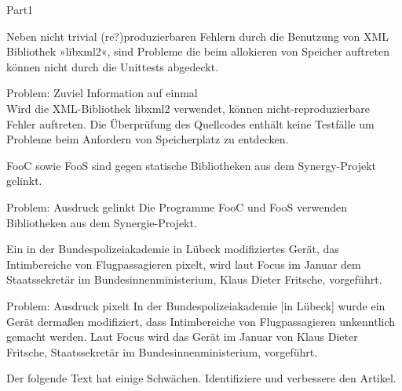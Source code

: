 \documentclass[a4paper,twoside]{article}
\newcommand{\gquote}[1]{\glqq #1\grqq}
\begin{document}
\begin{exam}[Teil I.]{Part1}
\begin{problem}[3]
Neben nicht trivial (re?)produzierbaren Fehlern durch die Benutzung von
XML Bibliothek »libxml2«, sind Probleme die beim allokieren von Speicher 
auftreten können nicht durch die Unittests abgedeckt. 
\begin{solution}
Problem: Zuviel Information auf einmal\\
Wird die XML-Bibliothek libxml2 verwendet, können nicht-reproduzierbare
Fehler auftreten. 
Die Überprüfung des Quellcodes enthält keine Testfälle um Probleme
beim Anfordern von Speicherplatz zu entdecken.
\end{solution}
\end{problem}


\begin{problem}[3]
FooC sowie FooS sind gegen statische Bibliotheken aus dem
Synergy-Projekt gelinkt. 
\begin{solution}
Problem: Ausdruck \gquote{gelinkt}
Die Programme FooC und FooS verwenden Bibliotheken aus dem Synergie-Projekt.
\end{solution}
\end{problem}


\begin{problem}[3]
Ein in der Bundespolizeiakademie in Lübeck modifiziertes Gerät, das 
Intimbereiche von Flugpassagieren pixelt, wird laut Focus im Januar dem 
Staatssekretär im Bundesinnenministerium, Klaus Dieter Fritsche, vorgeführt.
\begin{solution}
Problem: Ausdruck \gquote{pixelt}
In der Bundespolizeiakademie [in Lübeck] wurde ein Gerät dermaßen modifiziert, 
dass Intimbereiche von Flugpassagieren unkenntlich gemacht werden.
Laut Focus wird das Gerät im Januar von Klaus Dieter Fritsche, Staatssekretär
im Bundesinnenministerium, vorgeführt.
\end{solution}
\end{problem}


% 


\begin{instructions}[Korrektur]
Der folgende Text hat einige Schwächen. Identifiziere und verbessere den Artikel.
\end{instructions}


\end{exam}
\end{document}
